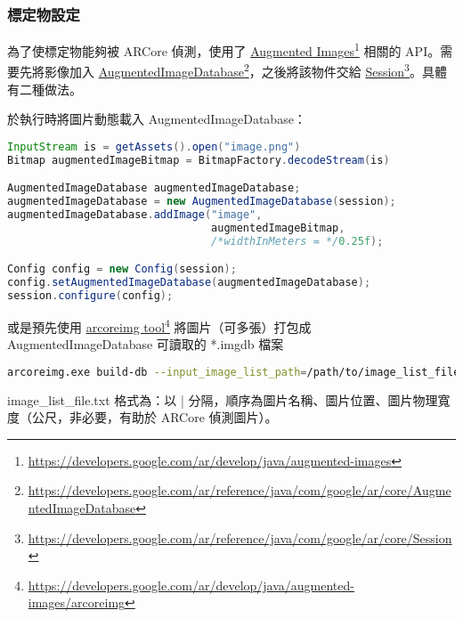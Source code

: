 \subsubsection{標定物設定}

為了使標定物能夠被 ARCore 偵測，使用了 \href{https://developers.google.com/ar/develop/java/augmented-images}{Augmented Images}\footnote{\url{https://developers.google.com/ar/develop/java/augmented-images}} 相關的 API。需要先將影像加入 \href{https://developers.google.com/ar/reference/java/com/google/ar/core/AugmentedImageDatabase}{AugmentedImageDatabase}\footnote{\url{https://developers.google.com/ar/reference/java/com/google/ar/core/AugmentedImageDatabase}}，之後將該物件交給 \href{https://developers.google.com/ar/reference/java/com/google/ar/core/Session}{Session}\footnote{\url{https://developers.google.com/ar/reference/java/com/google/ar/core/Session}}。具體有二種做法。

於執行時將圖片動態載入 AugmentedImageDatabase：

\begin{lstlisting}[language=Java, caption=動態載入圖片]
InputStream is = getAssets().open("image.png")
Bitmap augmentedImageBitmap = BitmapFactory.decodeStream(is)

AugmentedImageDatabase augmentedImageDatabase;
augmentedImageDatabase = new AugmentedImageDatabase(session);
augmentedImageDatabase.addImage("image",　
                                augmentedImageBitmap,
                                /*widthInMeters = */0.25f);

Config config = new Config(session);
config.setAugmentedImageDatabase(augmentedImageDatabase);
session.configure(config);
\end{lstlisting}

或是預先使用 \href{https://developers.google.com/ar/develop/java/augmented-images/arcoreimg}{arcoreimg tool}\footnote{\url{https://developers.google.com/ar/develop/java/augmented-images/arcoreimg}} 將圖片（可多張）打包成 AugmentedImageDatabase 可讀取的 *.imgdb 檔案

\begin{lstlisting}[language=bash, caption=使用 arcoreimg tool 將圖片打包]
arcoreimg.exe build-db --input_image_list_path=/path/to/image_list_file.txt --output_db_path=/path/to/myimages.imgdb
\end{lstlisting}

image\_list\_file.txt 格式為：以 | 分隔，順序為圖片名稱、圖片位置、圖片物理寬度（公尺，非必要，有助於 ARCore 偵測圖片）。

